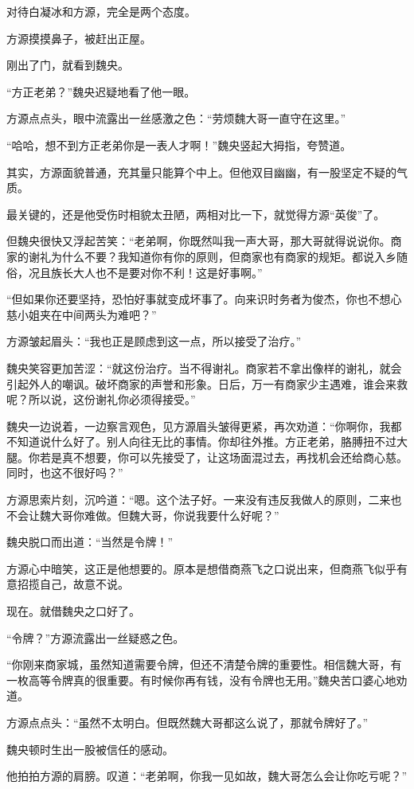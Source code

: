\begin{this_body}
对待白凝冰和方源，完全是两个态度。

方源摸摸鼻子，被赶出正屋。

刚出了门，就看到魏央。

“方正老弟？”魏央迟疑地看了他一眼。

方源点点头，眼中流露出一丝感激之色：“劳烦魏大哥一直守在这里。”

“哈哈，想不到方正老弟你是一表人才啊！”魏央竖起大拇指，夸赞道。

其实，方源面貌普通，充其量只能算个中上。但他双目幽幽，有一股坚定不疑的气质。

最关键的，还是他受伤时相貌太丑陋，两相对比一下，就觉得方源“英俊”了。

但魏央很快又浮起苦笑：“老弟啊，你既然叫我一声大哥，那大哥就得说说你。商家的谢礼为什么不要？我知道你有你的原则，但商家也有商家的规矩。都说入乡随俗，况且族长大人也不是要对你不利！这是好事啊。”

“但如果你还要坚持，恐怕好事就变成坏事了。向来识时务者为俊杰，你也不想心慈小姐夹在中间两头为难吧？”

方源皱起眉头：“我也正是顾虑到这一点，所以接受了治疗。”

魏央笑容更加苦涩：“就这份治疗。当不得谢礼。商家若不拿出像样的谢礼，就会引起外人的嘲讽。破坏商家的声誉和形象。日后，万一有商家少主遇难，谁会来救呢？所以说，这份谢礼你必须得接受。”

魏央一边说着，一边察言观色，见方源眉头皱得更紧，再次劝道：“你啊你，我都不知道说什么好了。别人向往无比的事情。你却往外推。方正老弟，胳膊扭不过大腿。你若是真不想要，你可以先接受了，让这场面混过去，再找机会还给商心慈。同时，也这不很好吗？”

方源思索片刻，沉吟道：“嗯。这个法子好。一来没有违反我做人的原则，二来也不会让魏大哥你难做。但魏大哥，你说我要什么好呢？”

魏央脱口而出道：“当然是令牌！”

方源心中暗笑，这正是他想要的。原本是想借商燕飞之口说出来，但商燕飞似乎有意招揽自己，故意不说。

现在。就借魏央之口好了。

“令牌？”方源流露出一丝疑惑之色。

“你刚来商家城，虽然知道需要令牌，但还不清楚令牌的重要性。相信魏大哥，有一枚高等令牌真的很重要。有时候你再有钱，没有令牌也无用。”魏央苦口婆心地劝道。

方源点点头：“虽然不太明白。但既然魏大哥都这么说了，那就令牌好了。”

魏央顿时生出一股被信任的感动。

他拍拍方源的肩膀。叹道：“老弟啊，你我一见如故，魏大哥怎么会让你吃亏呢？”


\end{this_body}
